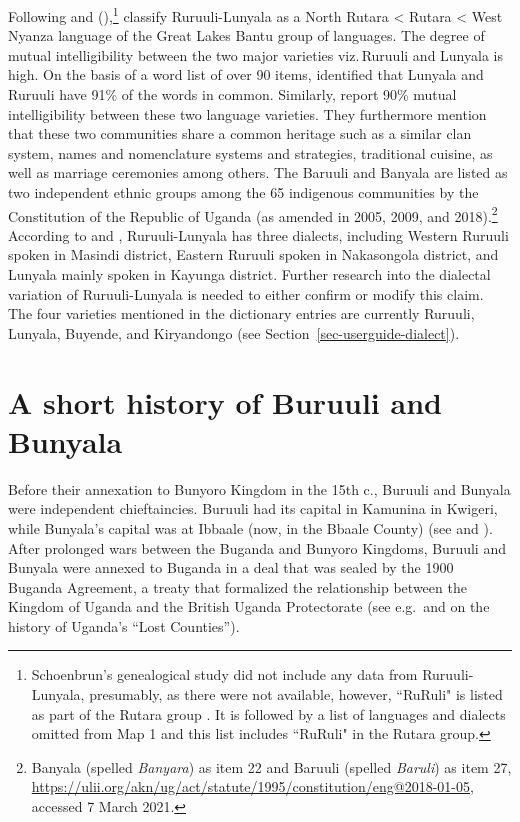 \largerpage[-1]
Following \citet{Ladefogedetal1972Language} and \citeauthor{Schoenbrun1994Great} (\citeyear{Schoenbrun1994Great,Schoenbrun1997Historical}),\footnote{Schoenbrun's genealogical study did not include any data from Ru\-ruu\-li\hyp{}Lu\-nya\-la, presumably,  as there were not available, however, ``RuRuli" is listed as part of the Rutara group \citet[118–119]{Schoenbrun1994Great}.
It is followed by a list of languages and dialects omitted from Map 1 and this list includes ``RuRuli" in the Rutara group.}  
\citet{Hammarstrometal2017Glottolog32} classify Ru\-ruu\-li\hyp{}Lu\-nya\-la as a North Rutara < Rutara < West Nyanza language of the Great Lakes Bantu group of languages. 
The degree of mutual intelligibility between the two major varieties viz.\,Ruruuli and Lunyala is high. 
On the basis of a word list of over 90 items, \citet[74]{Ladefogedetal1972Language} identified that Lunyala and Ruruuli have 91\% of the words in common.  
Similarly, \citet{VanderWaletal2005Luruuri} report 90\% mutual intelligibility between these two language varieties. 
They furthermore mention that these two communities share a common heritage such as a similar clan system, names and nomenclature systems and strategies, traditional cuisine, as well as marriage ceremonies among others. 
The  Baruuli and Banyala are listed as two independent ethnic groups among the 65 indigenous communities by the Constitution of the Republic of Uganda (as amended in 2005, 2009, and 2018).\footnote{Banyala (spelled \emph{Banyara}) as item 22 and Baruuli (spelled \emph{Baruli}) as item 27, \url{https://ulii.org/akn/ug/act/statute/1995/constitution/eng@2018-01-05}, accessed 7 March 2021.} 
According to \citet{VanderWaletal2005Luruuri} and \citet[179]{Nakayiza2013Sociolinguistics}, Ru\-ruu\-li\hyp{}Lu\-nya\-la has three dialects, including Western Ruruuli spoken in Masindi district, Eastern Ruruuli spoken in Nakasongola district, and Lunyala mainly spoken in Kayunga district. 
Further research into the dialectal variation of Ru\-ruu\-li\hyp{}Lu\-nya\-la is needed to either confirm or modify this claim.  
The four varieties mentioned in the dictionary entries are currently Ruruuli, Lunyala, Buyende, and Kiryandongo (see Section~\ref{sec-userguide-dialect}).

\section{A short history of Buruuli and Bunyala }
Before their annexation to Bunyoro Kingdom in the 15th c., Buruuli and Bunyala were independent chieftaincies. 
Buruuli had its capital in Kamunina in Kwigeri, while Bunyala’s capital was at Ibbaale (now, in the Bbaale County) (see \citealt{Semakula1972History} and \citealt{Musoke2005Buruuli}). 
After prolonged wars between the Buganda and Bunyoro Kingdoms, Buruuli and Bunyala were annexed to Buganda in a deal that was sealed by the 1900 Buganda Agreement, a treaty that formalized the relationship between the Kingdom of Uganda and the British Uganda Protectorate (see e.g.\,\citealt{Green2008Understanding} and \citealt{Stonehouse2012Peripheral} on the history of Uganda's “Lost Counties”). 

